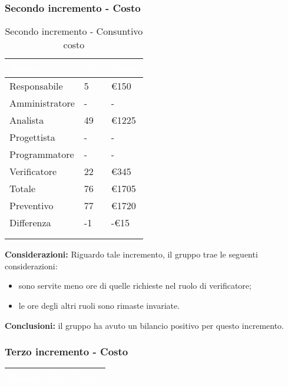 {    \subsubsection{Secondo incremento - Costo}
    {
      \setlength{\freewidth}{\dimexpr\textwidth-30\tabcolsep}
      \renewcommand{\arraystretch}{1.0}
      \centering
      \setlength{\aboverulesep}{0pt}
      \setlength{\belowrulesep}{0pt}
      \begin{longtable}{C{.4\freewidth} C{.2\freewidth} C{.2\freewidth}}
      \toprule
      \textcolor{white}{\textbf{Ruolo}}&
      \textcolor{white}{\textbf{Ore}}&
      \textcolor{white}{\textbf{Costo}}\\
      \toprule
      \endhead

      Responsabile & 5 & €150 \\
      Amministratore & - & - \\
      Analista & 49 & €1225 \\
      Progettista & - & - \\
      Programmatore & - & - \\
      Verificatore & 22 & €345 \\
      Totale & 76 & €1705 \\
      Preventivo & 77 & €1720 \\
      Differenza & -1 & -€15 \\
      \bottomrule
      \\
      \caption{Secondo incremento - Consuntivo costo}

      \end{longtable} 
    
      \textbf{Considerazioni:} 
        Riguardo tale incremento, il gruppo trae le seguenti considerazioni:
        \begin{itemize}
            \item sono servite meno ore di quelle richieste nel ruolo di verificatore;
            \item le ore degli altri ruoli sono rimaste invariate.
        \end{itemize}

        \textbf{Conclusioni:} il gruppo ha avuto un bilancio positivo per questo incremento. 
    }

    \subsubsection{Terzo incremento - Costo}
    {
      \setlength{\freewidth}{\dimexpr\textwidth-30\tabcolsep}
      \renewcommand{\arraystretch}{1.0}
      \centering
      \setlength{\aboverulesep}{0pt}
      \setlength{\belowrulesep}{0pt}
      \begin{longtable}{C{.4\freewidth} C{.2\freewidth} C{.2\freewidth}}
      \toprule
      \textcolor{white}{\textbf{Ruolo}}&
      \textcolor{white}{\textbf{Ore}}&
      \textcolor{white}{\textbf{Costo}}\\
      \toprule
      \endhead


\end{longtable}}}
